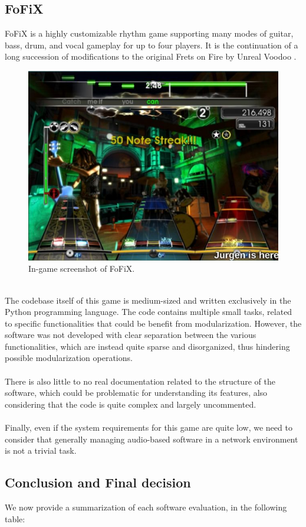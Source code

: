 \subsection{FoFiX}
FoFiX is a highly customizable rhythm game supporting many modes of guitar, bass, drum, and vocal gameplay for up to four players. It is the continuation of a long succession of modifications to the original Frets on Fire by Unreal Voodoo \cite{site:fofix-github}. 
\begin{figure}[h!]
	\centering
	\includegraphics[width=0.75\linewidth]{"immagini/Feasibility study/Fofix"}
	\caption[In-game screenshot of FoFiX]{In-game screenshot of FoFiX.}
	\label{fig:fofix}
\end{figure}
\\ The codebase itself of this game is medium-sized and written exclusively in the Python programming language. The code contains multiple small tasks, related to specific functionalities that could be benefit from modularization. However, the software was not developed with clear separation between the various functionalities, which are instead quite sparse and disorganized, thus hindering possible modularization operations. \\ \\
There is also little to no real documentation related to the structure of the software, which could be problematic for understanding its features, also considering that the code is quite complex and largely uncommented. \\ \\
Finally, even if the system requirements for this game are quite low, we need to consider that generally managing audio-based software in a network environment is not a trivial task.

\subsection{Conclusion and Final decision}
We now provide a summarization of each software evaluation, in the following table:

